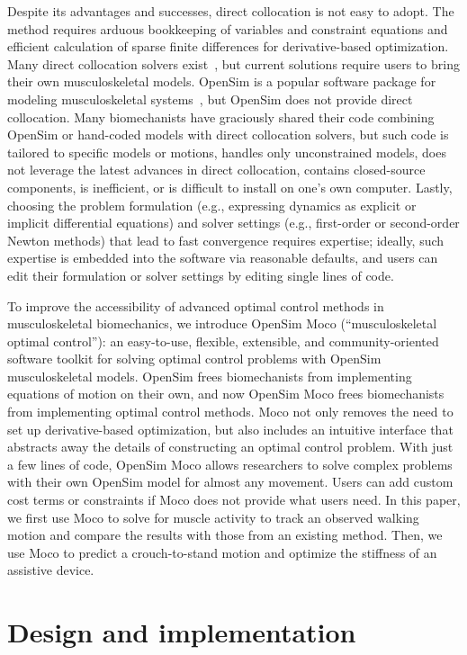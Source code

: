 \documentclass[10pt,letterpaper]{article}
\begin{document}
Despite its advantages and successes, direct collocation is not easy to adopt. The method requires arduous bookkeeping of variables and constraint equations and efficient calculation of sparse finite differences for derivative-based optimization. Many direct collocation solvers exist~\cite{Becerra:2010,Patterson:2014}, but current solutions require users to bring their own musculoskeletal models. OpenSim is a popular software package for modeling musculoskeletal systems~\cite{Seth:2018gg}, but OpenSim does not provide direct collocation. Many biomechanists have graciously shared their code combining OpenSim or hand-coded models with direct collocation solvers, but such code is tailored to specific models or motions, handles only unconstrained models, does not leverage the latest advances in direct collocation, contains closed-source components, is inefficient, or is difficult to install on one’s own computer. Lastly, choosing the problem formulation (e.g., expressing dynamics as explicit or implicit differential equations) and solver settings (e.g., first-order or second-order Newton methods) that lead to fast convergence requires expertise; ideally, such expertise is embedded into the software via reasonable defaults, and users can edit their formulation or solver settings by editing single lines of code.

To improve the accessibility of advanced optimal control methods in musculoskeletal biomechanics, we introduce OpenSim Moco (“musculoskeletal optimal control”): an easy-to-use, flexible, extensible, and community-oriented software toolkit for solving optimal control problems with OpenSim musculoskeletal models. OpenSim frees biomechanists from implementing equations of motion on their own, and now OpenSim Moco frees biomechanists from implementing optimal control methods. Moco not only removes the need to set up derivative-based optimization, but also includes an intuitive interface that abstracts away the details of constructing an optimal control problem. With just a few lines of code, OpenSim Moco allows researchers to solve complex problems with their own OpenSim model for almost any movement. Users can add custom cost terms or constraints if Moco does not provide what users need. In this paper, we first use Moco to solve for muscle activity to track an observed walking motion and compare the results with those from an existing method. Then, we use Moco to predict a crouch-to-stand motion and optimize the stiffness of an assistive device.

\section*{Design and implementation}
\end{document}
